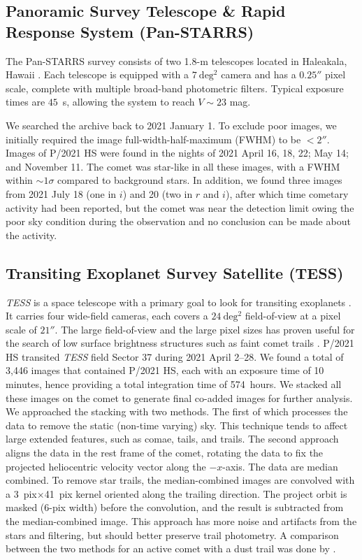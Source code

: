 \documentclass[modern]{aastex631}
\begin{document}
\begin{CJK*}{UTF8}{gbsn}
\subsection{Panoramic Survey Telescope \& Rapid Response System (Pan-STARRS)}

The Pan-STARRS survey consists of two 1.8-m telescopes located in Haleakala, Hawaii \citep{Chambers2016}. Each telescope is equipped with a $7~\mathrm{deg^2}$ camera and has a $0.25''$ pixel scale, complete with multiple broad-band photometric filters. Typical exposure times are $45$~s, allowing the system to reach $V\sim23$ mag.

We searched the archive back to 2021 January 1. To exclude poor images, we initially required the image full-width-half-maximum (FWHM) to be $<2''$. Images of P/2021 HS were found in the nights of 2021 April 16, 18, 22; May 14; and November 11. The comet was star-like in all these images, with a FWHM within $\sim1\sigma$ compared to background stars. In addition, we found three images from 2021 July 18 (one in $i$) and 20 (two in $r$ and $i$), after which time cometary activity had been reported, but the comet was near the detection limit owing the poor sky condition during the observation and no conclusion can be made about the activity.

\subsection{Transiting Exoplanet Survey Satellite (TESS)}

{\it TESS} is a space telescope with a primary goal to look for transiting exoplanets \citep{Ricker2015}. It carries four wide-field cameras, each covers a $24~\mathrm{deg^2}$ field-of-view at a pixel scale of $21''$. The large field-of-view and the large pixel sizes has proven useful for the search of low surface brightness structures such as faint comet trails \citep[e.g., the trail of 46P/Wirtanen,][]{Farnham2019}. P/2021 HS transited {\it TESS} field Sector 37 during 2021 April 2--28. We found a total of 3,446 images that contained P/2021 HS, each with an exposure time of 10 minutes, hence providing a total integration time of 574~hours. We stacked all these images on the comet to generate  final co-added images for further analysis.  We approached the stacking with two methods. The first of which processes the data to remove the static (non-time varying) sky. This technique tends to affect large extended features, such as comae, tails, and trails. The second approach aligns the data in the rest frame of the comet, rotating the data to fix the projected heliocentric velocity vector along the $-x$-axis.  The data are median combined. To remove star trails, the median-combined images are convolved with a 3~pix$\times$41~pix kernel oriented along the trailing direction. The project orbit is masked (6-pix width) before the convolution, and the result is subtracted from the median-combined image.  This approach has more noise and artifacts from the stars and filtering, but should better preserve trail photometry. A comparison between the two methods for an active comet with a dust trail was done by \citet{Farnham2019}.


\end{CJK*}
\end{document}
